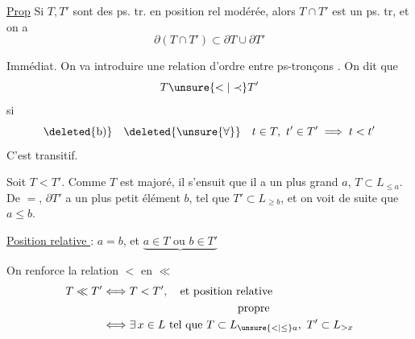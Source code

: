 \noindent\llap{\rule[-1.05\baselineskip]{0.4pt}{1.85\baselineskip}\hspace{0.65em}}\uline{Prop} Si $T,T'$ sont des ps. tr. en position rel modérée, alors $T\cap T'$ est  un ps. tr, et on a
\[
\partial(T\cap T')\subset\partial T\cup\partial T'
\]

Immédiat. On va introduire une relation d'ordre entre ps-tronçons . On dit que
\[
T\unsure{<|\prec}T'
\]
si 
\[
\deleted{\text{b)}}\quad\deleted{\unsure{\forall}}\quad t\in T,\ t'\in T'\implies t<t'
\]
C'est  transitif.

Soit $T<T'$. Comme $T$ est majoré, il s'ensuit que  il a un plus grand   $a$,   $T\subset L_{\leq a}$.  De $=$, $\partial T'$ a un plus petit élément $b$, tel que $T'\subset L_{\geq b}$,   et on voit de suite que $a\leq b$.

\uline{Position relative  } : $a=b$, et $\underbrace{a\in T\text{ ou }b\in T'}$%


On renforce la relation $<$ en $\ll$
\[
\begin{aligned}
T\ll T' &\Longleftrightarrow T<T',\quad\text{et position relative}\\
&\hspace{12em}\text{propre}\\
&\Longleftrightarrow \exists\,x\in L\text{ tel que }T\subset L_{\unsure{<|\leq}a},\ T'\subset L_{>x}
\end{aligned}
\]
